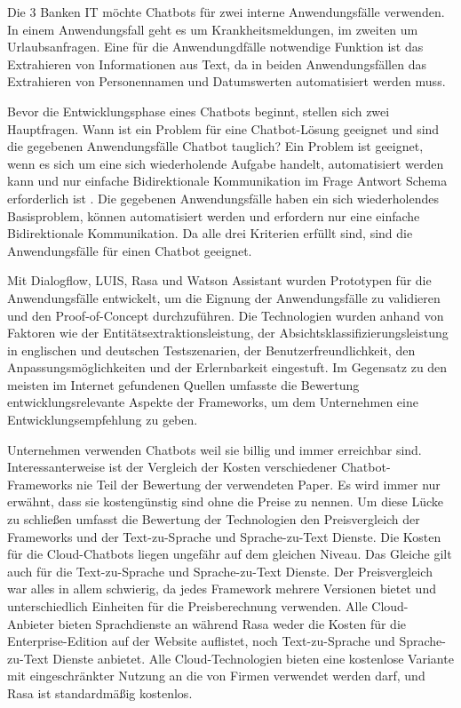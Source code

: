 Die 3 Banken IT möchte Chatbots für zwei interne Anwendungsfälle verwenden.
In einem Anwendungsfall geht es um Krankheitsmeldungen, im zweiten um Urlaubsanfragen.
Eine für die Anwendungdfälle notwendige Funktion ist das Extrahieren von Informationen aus Text, da in beiden Anwendungsfällen das Extrahieren von Personennamen und Datumswerten automatisiert werden muss.

Bevor die Entwicklungsphase eines Chatbots beginnt, stellen sich zwei Hauptfragen.
Wann ist ein Problem für eine Chatbot-Lösung geeignet und sind die gegebenen Anwendungsfälle Chatbot tauglich?
Ein Problem ist geeignet, wenn es sich um eine sich wiederholende Aufgabe handelt, automatisiert werden kann und nur einfache Bidirektionale Kommunikation im Frage Antwort Schema erforderlich ist \cite{buiildChatbotsPython}.
Die gegebenen Anwendungsfälle haben ein sich wiederholendes Basisproblem, können automatisiert werden und erfordern nur eine einfache Bidirektionale Kommunikation.
Da alle drei Kriterien erfüllt sind, sind die Anwendungsfälle für einen Chatbot geeignet.

Mit Dialogflow, LUIS, Rasa und Watson Assistant wurden Prototypen für die Anwendungsfälle entwickelt, um die Eignung der Anwendungsfälle zu validieren und den Proof-of-Concept durchzuführen.
Die Technologien wurden anhand von Faktoren wie der Entitätsextraktionsleistung, der Absichtsklassifizierungsleistung in englischen und deutschen Testszenarien, der 
Benutzerfreundlichkeit, den Anpassungsmöglichkeiten und der Erlernbarkeit eingestuft.
Im Gegensatz zu den meisten im Internet gefundenen Quellen umfasste die Bewertung entwicklungsrelevante Aspekte der Frameworks, um dem Unternehmen eine Entwicklungsempfehlung zu geben.

Unternehmen verwenden Chatbots weil sie billig und immer erreichbar sind.
Interessanterweise ist der Vergleich der Kosten verschiedener Chatbot-Frameworks nie Teil der Bewertung der verwendeten Paper.
Es wird immer nur erwähnt, dass sie kostengünstig sind ohne die Preise zu nennen.
Um diese Lücke zu schließen umfasst die Bewertung der Technologien den Preisvergleich der Frameworks und der Text-zu-Sprache und Sprache-zu-Text Dienste.
Die Kosten für die Cloud-Chatbots liegen ungefähr auf dem gleichen Niveau.
Das Gleiche gilt auch für die Text-zu-Sprache und Sprache-zu-Text Dienste.
Der Preisvergleich war alles in allem schwierig, da jedes Framework mehrere Versionen bietet und unterschiedlich Einheiten für die Preisberechnung verwenden.
Alle Cloud-Anbieter bieten Sprachdienste an während Rasa weder die Kosten für die Enterprise-Edition auf der Website auflistet, noch Text-zu-Sprache und Sprache-zu-Text Dienste anbietet.
Alle Cloud-Technologien bieten eine kostenlose Variante mit eingeschränkter Nutzung an die von Firmen verwendet werden darf, und Rasa ist standardmäßig kostenlos.

